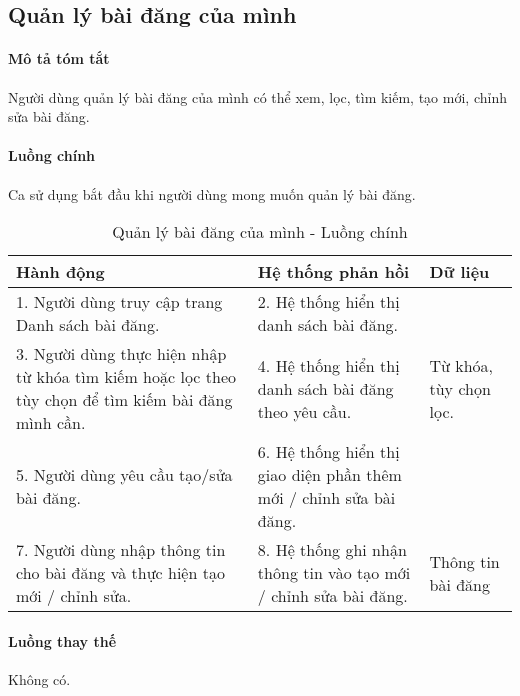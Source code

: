 \documentclass[./../main.tex]{subfiles}
\begin{document}
\subsection{Quản lý bài đăng của mình}

\paragraph*{Mô tả tóm tắt}

Người dùng quản lý bài đăng của mình có thể xem, lọc, tìm kiếm, tạo mới, chỉnh sửa bài đăng.

\paragraph*{Luồng chính} Ca sử dụng bắt đầu khi người dùng mong muốn quản lý bài đăng.

\begin{table}[H]
	\caption{Quản lý bài đăng của mình - Luồng chính}
	\label{tab:partner_manage_posts}
	\begin{tabularx}{\textwidth}{|X|X|X|}
		\hline
		\textbf{Hành động}                                                                                  & \textbf{Hệ thống phản hồi}                                         & \textbf{Dữ liệu}       \\ \hline
		1. Người dùng truy cập trang Danh sách bài đăng.                                                    & 2. Hệ thống hiển thị danh sách bài đăng.                           &                        \\ \hline
		3. Người dùng thực hiện nhập từ khóa tìm kiếm hoặc lọc theo tùy chọn để tìm kiếm bài đăng mình cần. & 4. Hệ thống hiển thị danh sách bài đăng theo yêu cầu.              & Từ khóa, tùy chọn lọc. \\ \hline
		5. Người dùng yêu cầu tạo/sửa bài đăng.                                                             & 6. Hệ thống hiển thị giao diện phần thêm mới / chỉnh sửa bài đăng. &                        \\ \hline
		7. Người dùng nhập thông tin cho bài đăng và thực hiện tạo mới / chỉnh sửa.                         & 8. Hệ thống ghi nhận thông tin vào tạo mới / chỉnh sửa bài đăng.   & Thông tin bài đăng     \\ \hline
	\end{tabularx}
\end{table}

\paragraph*{Luồng thay thế} Không có.
\end{document}
